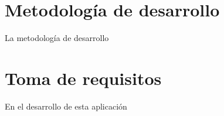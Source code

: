 
\section{Metodología de desarrollo}

La metodología de desarrollo 

\section{Toma de requisitos}

En el desarrollo de esta aplicación 
